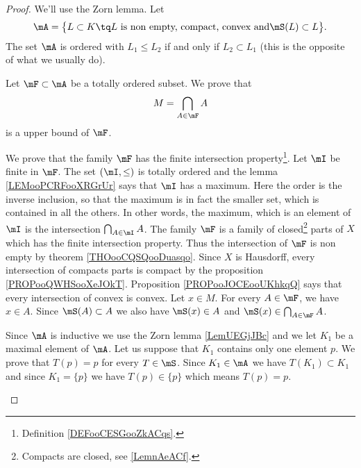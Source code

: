 \begin{proof}
    We'll use the Zorn lemma. Let 
    \begin{equation}
        \mA=\big\{  L\subset K\tq L \text{ is non empty, compact, convex and} \mS(L)\subset L   \big\}.
    \end{equation}
    The set \( \mA\) is ordered with \( L_1\leq L_2\) if and only if \( L_2\subset L_1\) (this is the opposite of what we usually do).

    \begin{subproof}
        Let \( \mF\subset \mA\) be a totally ordered subset. We prove that 
        \begin{equation}
            M=\bigcap_{A\in \mF}A
        \end{equation}
        is a upper bound of \( \mF\).
        \begin{subproof}
            We prove that the family \( \mF\) has the finite intersection property\footnote{Definition \ref{DEFooCESGooZkACqs}.}. Let \( \mI\) be finite in \( \mF\). The set \( (\mI,\leq)\) is totally ordered and the lemma \ref{LEMooPCRFooXRGrUr} says that \( \mI\) has a maximum. Here the order is the inverse inclusion, so that the maximum is in fact the smaller set, which is contained in all the others. In other words, the maximum, which is an element of \( \mI\) is the intersection \( \bigcap_{A\in\mI}A\).
            The family \( \mF\) is a family of closed\footnote{Compacts are closed, see \ref{LemnAeACf}.} parts of \( X\) which has the finite intersection property. Thus the intersection of \( \mF\) is non empty by theorem \ref{THOooCQSQooDuasqo}.
            \spitem[\( M\) is compact] 
            Since \( X\) is Hausdorff, every intersection of compacts parts is compact by the proposition \ref{PROPooQWHSooXeJOkT}.
        \spitem[\( M\) is convex]
            Proposition \ref{PROPooJOCEooUKhkqQ} says that every intersection of convex is convex.
        \spitem[\( \mS(M)\subset\mS(M)\)]
            Let \( x\in M\). For every \( A\in \mF\), we have \( x\in A\). Since \( \mS(A)\subset A\) we also have \( \mS(x)\in A\) and \( \mS(x)\in \bigcap_{A\in\mF}A\).
        \end{subproof}
        Since \( \mA\) is inductive we use the Zorn lemma \ref{LemUEGjJBc} and we let \( K_1\) be a maximal element of \( \mA\).
        Let us suppose that \( K_1\) contains only one element \( p\). We prove that \( T(p)=p\) for every \( T\in\mS\). Since \( K_1\in \mA\) we have \( T(K_1)\subset K_1\) and since \( K_1=\{ p \}\) we have \( T(p)\in \{ p \}\) which means \( T(p)=p\).

\end{subproof}
\end{proof}
